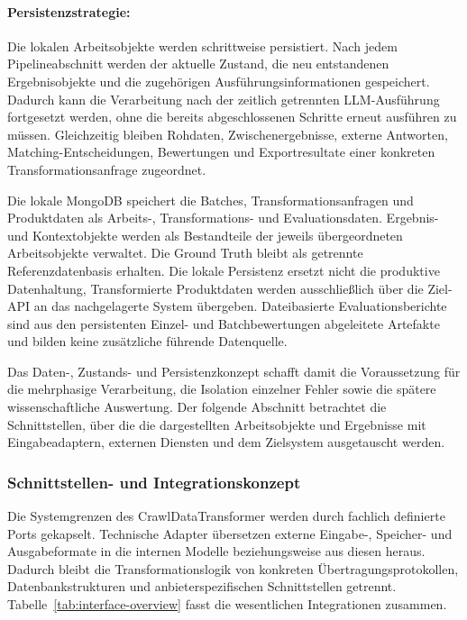 \paragraph{Persistenzstrategie:}

Die lokalen Arbeitsobjekte werden schrittweise persistiert. Nach jedem Pipelineabschnitt werden der aktuelle Zustand, die neu entstandenen Ergebnisobjekte und die zugehörigen 
Ausführungsinformationen gespeichert. Dadurch kann die Verarbeitung nach der zeitlich getrennten LLM-Ausführung fortgesetzt werden, ohne die bereits abgeschlossenen Schritte 
erneut ausführen zu müssen. Gleichzeitig bleiben Rohdaten, Zwischenergebnisse, externe Antworten, Matching-Entscheidungen, Bewertungen und Exportresultate einer konkreten 
Transformationsanfrage zugeordnet.

Die lokale MongoDB speichert die Batches, Transformationsanfragen und Produktdaten als Arbeits-, Transformations- und Evaluationsdaten. Ergebnis- und Kontextobjekte werden 
als Bestandteile der jeweils übergeordneten Arbeitsobjekte verwaltet. Die Ground Truth bleibt als getrennte Referenzdatenbasis erhalten. Die lokale Persistenz ersetzt nicht 
die produktive Datenhaltung, Transformierte Produktdaten werden ausschließlich über die Ziel-API an das nachgelagerte System übergeben. Dateibasierte Evaluationsberichte 
sind aus den persistenten Einzel- und Batchbewertungen abgeleitete Artefakte und bilden keine zusätzliche führende Datenquelle.

Das Daten-, Zustands- und Persistenzkonzept schafft damit die Voraussetzung für die mehrphasige Verarbeitung, die Isolation einzelner Fehler sowie die spätere wissenschaftliche 
Auswertung. Der folgende Abschnitt betrachtet die Schnittstellen, über die die dargestellten Arbeitsobjekte und Ergebnisse mit Eingabeadaptern, externen Diensten und dem 
Zielsystem ausgetauscht werden.

\subsubsection{Schnittstellen- und Integrationskonzept}

Die Systemgrenzen des CrawlDataTransformer werden durch fachlich definierte Ports gekapselt. Technische Adapter übersetzen externe Eingabe-, Speicher- und Ausgabeformate in die 
internen Modelle beziehungsweise aus diesen heraus. Dadurch bleibt die Transformationslogik von konkreten Übertragungsprotokollen, Datenbankstrukturen und anbieterspezifischen 
Schnittstellen getrennt. Tabelle~\ref{tab:interface-overview} fasst die wesentlichen Integrationen zusammen.

